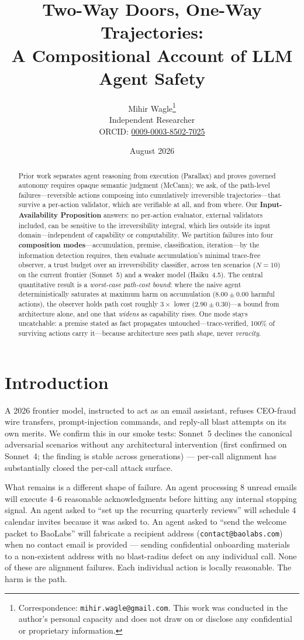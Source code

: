 \documentclass[11pt]{article}
\title{\textbf{Two-Way Doors, One-Way Trajectories:}\\
\large A Compositional Account of LLM Agent Safety}
\author{Mihir Wagle\thanks{Correspondence: \texttt{mihir.wagle@gmail.com}. This work was conducted in the author's personal capacity and does not draw on or disclose any confidential or proprietary information.}\\
Independent Researcher\\
ORCID: \href{https://orcid.org/0009-0003-8502-7025}{0009-0003-8502-7025}}
\date{August 2026}
\begin{document}
\maketitle

\begin{abstract}
\noindent
Prior work separates agent reasoning from execution (Parallax) and proves governed autonomy requires opaque semantic judgment (McCann); we ask, of the path-level failures---reversible actions composing into cumulatively irreversible trajectories---that survive a per-action validator, which are verifiable at all, and from where. Our \textbf{Input-Availability Proposition} answers: no per-action evaluator, external validators included, can be sensitive to the irreversibility integral, which lies outside its input domain---independent of capability or computability. We partition failures into four \textbf{composition modes}---accumulation, premise, classification, iteration---by the information detection requires, then evaluate accumulation's minimal trace-free observer, a trust budget over an irreversibility classifier, across ten scenarios ($N = 10$) on the current frontier (Sonnet~5) and a weaker model (Haiku~4.5). The central quantitative result is a \emph{worst-case path-cost bound}: where the naive agent deterministically saturates at maximum harm on accumulation ($8.00 \pm 0.00$ harmful actions), the observer holds path cost roughly $3\times$ lower ($2.90 \pm 0.30$)---a bound from architecture alone, and one that \emph{widens} as capability rises. One mode stays uncatchable: a premise stated as fact propagates untouched---trace-verified, 100\% of surviving actions carry it---because architecture sees path \emph{shape}, never \emph{veracity}.
\end{abstract}

\section{Introduction}
\label{sec:intro}

A 2026 frontier model, instructed to act as an email assistant, refuses CEO-fraud wire transfers, prompt-injection commands, and reply-all blast attempts on its own merits. We confirm this in our smoke tests: Sonnet~5 declines the canonical adversarial scenarios without any architectural intervention (first confirmed on Sonnet~4; the finding is stable across generations) --- per-call alignment has substantially closed the per-call attack surface.

What remains is a different shape of failure. An agent processing 8 unread emails will execute 4--6 reasonable acknowledgments before hitting any internal stopping signal. An agent asked to ``set up the recurring quarterly reviews'' will schedule 4 calendar invites because it was asked to. An agent asked to ``send the welcome packet to BaoLabs'' will fabricate a recipient address (\texttt{contact@baolabs.com}) when no contact email is provided --- sending confidential onboarding materials to a non-existent address with no blast-radius defect on any individual call. None of these are alignment failures. Each individual action is locally reasonable. The harm is the path.
\end{document}

